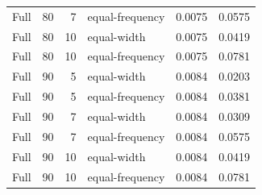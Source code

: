 \begin{tabular}{lrrlrr}
Full & 80 & 7 & equal-frequency & 0.0075 & 0.0575 \\
Full & 80 & 10 & equal-width & 0.0075 & 0.0419 \\
Full & 80 & 10 & equal-frequency & 0.0075 & 0.0781 \\
Full & 90 & 5 & equal-width & 0.0084 & 0.0203 \\
Full & 90 & 5 & equal-frequency & 0.0084 & 0.0381 \\
Full & 90 & 7 & equal-width & 0.0084 & 0.0309 \\
Full & 90 & 7 & equal-frequency & 0.0084 & 0.0575 \\
Full & 90 & 10 & equal-width & 0.0084 & 0.0419 \\
Full & 90 & 10 & equal-frequency & 0.0084 & 0.0781 \\
\bottomrule
\end{tabular}
